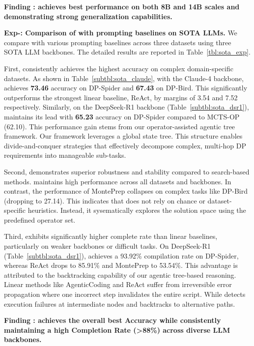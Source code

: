 \begin{shaded}
\noindent \textbf{Finding \findingnum: \sys achieves best performance on both 8B and 14B scales and demonstrating strong generalization capabilities.}
\end{shaded}

\noindent \textbf{Exp-\expnum\label{exp:prompting_comparison}: Comparison of \sysp with prompting baselines on SOTA LLMs.}
We compare \sysp with various prompting baselines across three datasets using three SOTA LLM backbones. The detailed results are reported in Table~\ref{tbl:sota_exp}. 

First, \sysp consistently achieves the highest accuracy on complex domain-specific datasets. As shown in Table~\ref{subtbl:sota_claude}, with the Claude-4 backbone, \sysp achieves \textbf{73.46} accuracy on DP-Spider and \textbf{67.43} on DP-Bird. This significantly outperforms the strongest linear baseline, ReAct, by margins of 3.54 and 7.52 respectively. Similarly, on the DeepSeek-R1 backbone (Table~\ref{subtbl:sota_dsr1}), \sysp maintains its lead with \textbf{65.23} accuracy on DP-Spider compared to MCTS-OP (62.10). This performance gain stems from our operator-assisted agentic tree framework. Our framework leverages a global state tree. This structure enables divide-and-conquer strategies that effectively decompose complex, multi-hop DP requirements into manageable sub-tasks.

Second, \sysp demonstrates superior robustness and stability compared to search-based methods. \sysp maintains high performance across all datasets and backbones. In contrast, the performance of MontePrep collapses on complex tasks like DP-Bird (dropping to 27.14). This indicates that \sysp does not rely on chance or dataset-specific heuristics. Instead, it sysematically explores the solution space using the predefined operator set.

Third, \sysp exhibits significantly higher complete rate than linear baselines, particularly on weaker backbones or difficult tasks. On DeepSeek-R1 (Table~\ref{subtbl:sota_dsr1}), \sysp achieves a 93.92\% compilation rate on DP-Spider, whereas ReAct drops to 85.91\% and MontePrep to 53.54\%. This advantage is attributed to the backtracking capability of our agentic tree-based reasoning. Linear methods like AgenticCoding and ReAct suffer from irreversible error propagation where one incorrect step invalidates the entire script. While \sysp detects execution failures at intermediate nodes and backtracks to alternative paths.

\begin{shaded}
\noindent \textbf{Finding \findingnum: \sysp achieves the overall best Accuracy while consistently maintaining a high Completion Rate (>88\%) across diverse LLM backbones.}
\end{shaded}